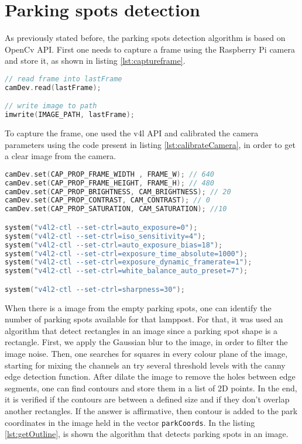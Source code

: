 \section{Parking spots detection}
As previously stated before, the parking spots detection algorithm is based on OpenCv API. First one needs to capture a frame using the Raspberry Pi camera and store it, as shown in listing \ref{lst:captureframe}. 

\begin{lstlisting}[language=C, caption={Capture and Store frame from Camera.}, label={lst:captureframe}]
// read frame into lastFrame
camDev.read(lastFrame);

// write image to path
imwrite(IMAGE_PATH, lastFrame);
\end{lstlisting}

To capture the frame, one used the \ac{v4l} API and calibrated the camera parameters using the code present in listing \ref{lst:calibrateCamera}, in order to get a clear image from the camera. 

\begin{lstlisting}[language=C, caption={Capture and Store frame from Camera.}, label={lst:calibrateCamera}]
camDev.set(CAP_PROP_FRAME_WIDTH , FRAME_W); // 640
camDev.set(CAP_PROP_FRAME_HEIGHT, FRAME_H); // 480
camDev.set(CAP_PROP_BRIGHTNESS, CAM_BRIGHTNESS); // 20
camDev.set(CAP_PROP_CONTRAST, CAM_CONTRAST); // 0
camDev.set(CAP_PROP_SATURATION, CAM_SATURATION); //10

system("v4l2-ctl --set-ctrl=auto_exposure=0");
system("v4l2-ctl --set-ctrl=iso_sensitivity=4");
system("v4l2-ctl --set-ctrl=auto_exposure_bias=18");
system("v4l2-ctl --set-ctrl=exposure_time_absolute=1000");
system("v4l2-ctl --set-ctrl=exposure_dynamic_framerate=1");
system("v4l2-ctl --set-ctrl=white_balance_auto_preset=7");

system("v4l2-ctl --set-ctrl=sharpness=30");
\end{lstlisting}

When there is a image from the empty parking spots, one can identify the number of parking spots available for that lamppost. For that, it was used an algorithm that detect rectangles in an image since a parking spot shape is a rectangle. First, we apply the Gaussian blur to the image, in order to filter the image noise. Then, one searches for squares in every colour plane of the image, starting for mixing the channels an try several threshold levels with the canny edge detection function. After dilate the image to remove the holes between edge segments, one can find contours and store them in a list of 2D points. In the end, it is verified if the contours are between a defined size and if they don't overlap another rectangles. If the answer is affirmative, then contour is added to the park coordinates in the image held in the vector \verb|parkCoords|. In the listing \ref{lst:getOutline}, is shown the algorithm that detects parking spots in an image.

